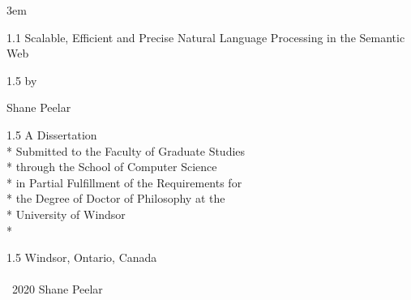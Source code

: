 \documentclass[fleqn, oneside, 12pt]{book}
\author{Shane Peelar}
\title{\dtitle}
\date{\defensedate}
\theoremstyle{definitionsty}
\newcommand{\uwinsinglespacelen}{1.1}
\newcommand{\uwinonehalfspacelen}{1.5}
\newenvironment{uwinsinglespaceenv}%
{\begin{spacing}{\uwinsinglespacelen}}%
	{\end{spacing}}
\newenvironment{uwinonehalfspaceenv}%
{\begin{spacing}{\uwinonehalfspacelen}}%
	{\end{spacing}}
\newcommand{\dtitle}{Scalable, Efficient and Precise Natural Language Processing in the Semantic Web}
\begin{document}
\emergencystretch 3em %

\setlength{\abovedisplayskip}{0pt}
\setlength{\belowdisplayskip}{12pt}
\setlength{\abovedisplayshortskip}{0pt}
\setlength{\belowdisplayshortskip}{0pt}




\clearpage


\thispagestyle{empty}
\begin{center}
	\vspace*{0in}

	\begin{uwinsinglespaceenv}
		\Large{\strong\dtitle}
	\end{uwinsinglespaceenv}

	\vspace{0.125in}
	\begin{uwinonehalfspaceenv}
		by

		Shane Peelar
	\end{uwinonehalfspaceenv}
	\vspace{1.625in}

	\begin{uwinonehalfspaceenv}
	A Dissertation \\*
	Submitted to the Faculty of Graduate Studies \\*
	through the School of Computer Science \\*
	in Partial Fulfillment of the Requirements for \\*
	the Degree of Doctor of Philosophy at the \\*
	University of Windsor \\*
	\end{uwinonehalfspaceenv}

	\vspace{0.625in}
	\begin{uwinonehalfspaceenv}
	Windsor, Ontario, Canada \\


	\phantom{2020} \\

	\textcopyright \  2020 Shane Peelar
	\end{uwinonehalfspaceenv}
\end{center}
\end{document}
